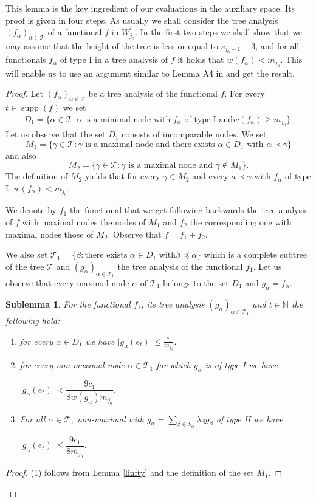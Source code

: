 \documentclass[a4paper]{amsart}
\theoremstyle{plain}
\newtheorem{sublemma}[theorem]{Sublemma}
\newcommand{\N}{\mathbb{N}}
\newcommand{\mc}{\mathcal}
\newcommand{\fa}{f_{\alpha}}
\newcommand{\ga}{g_{\alpha}}
\newcommand{\gb}{g_{\beta}}
\DeclareMathOperator{\supp}{supp}
\begin{document}
This lemma is the key ingredient of our evaluations in the auxiliary space. Its proof is
given in four steps. As usually we shall consider the tree analysis
$(\fa)_{\alpha\in\mc{T}}$ of a functional $f$ in $W_{j_0}^{\prime}$. In the first two
steps we shall show that we may assume that the height of the tree is less or equal to
$s_{j_0-1}-3$, and for all functionals $\fa$  of type I in a tree analysis of $f$ it
holds that $w(\fa)<m_{j_0}$. This will enable us to use an  argument similar to  Lemma A4
in \cite{AAT} and get the result.
\begin{proof}
Let  $(\fa)_{\alpha\in\mathcal{T}}$  be a tree analysis of the functional $f$.
For every $t\in \supp(f)$ we set
\begin{align*}
D_1=\{\alpha\in\mc{T}:\text{$\alpha$ is a minimal node} \text{ with $\fa$ of type I and
$w(\fa)\geq m_{j_0}$}\}.
\end{align*}
Let us observe that the set $D_1$ consists of incomparable nodes.
We set
$$
M_{1}=
\{\gamma\in\mc{T}: \text{$\gamma$ is a maximal  node and there exists $\alpha\in D_1$ with $\alpha\prec\gamma$}\}
$$
and also
$$
M_{2}=\{\gamma\in\mc{T}:\text{$\gamma$ is a maximal  node and $\gamma\not\in M_{1}$}\}.
$$
The definition of $M_{2}$ yields  that for every $\gamma\in M_{2}$ and every
$a\prec\gamma$ with $\fa$ of type I, $w(\fa)<m_{j_0}$.


We denote by $f_{1}$ the functional that we get following backwards the tree analysis of $f$ with
maximal nodes the nodes of $M_{1}$ and $f_{2}$
the corresponding one with maximal nodes those of $M_{2}$. Observe that $f=f_1+f_2$.

We also set $\mathcal{T}_{1}=\{\beta:\text{there exists $\alpha\in D_1$ with
$\beta\preceq\alpha$}\} $ which is a complete subtree of the tree $\mc{T}$  and
$(g_{\alpha})_{\alpha\in\mc{T}_{1}}$ the tree analysis of the functional $f_{1}$. Let us
observe that  every maximal node $\alpha$ of $\mc{T}_{1}$ belongs to the set
$D_1$ and $\ga=\fa$.
\begin{sublemma}
For the functional $f_{1}$, its tree analysis $(\ga)_{\alpha\in\mc{T}_{1}}$ and $t\in\N$
the following hold:
\begin{enumerate}
\item for every  $\alpha\in D_1$  we have $\vert \ga(e_t)\vert\leq\frac{c_{1}}{m_{j_0}}$.
\item for every non-maximal node $\alpha\in\mc{T}_{1}$  for which $\ga$ is of type I we
have
\begin{center}
$\vert\ga(e_t)\vert<\dfrac{9c_{1}}{8w(\ga)m_{j_0}}$.
\end{center}
\item For all $\alpha\in\mc{T}_{1}$ non-maximal with $\ga=\sum_{\beta\in
S_{\alpha}}\lambda_{\beta}\gb$ of type II  we have
\begin{center}$\vert \ga(e_t)\vert \leq\dfrac{9c_{1}}{8m_{j_0}}$.
\end{center}
\end{enumerate}
\end{sublemma}
\begin{proof}
(1) follows from Lemma \ref{linfty} and  the definition of the set $M_{1}$.



\end{proof}
\end{proof}
\end{document}
